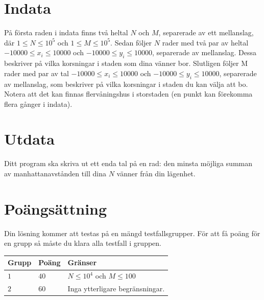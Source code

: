 \section*{Indata}
På första raden i indata finns två heltal $N$ och $M$, separerade av ett mellanslag, där $1 \leq N \leq 10^5$ och $1 \leq M \leq 10^5$. Sedan följer $N$ rader med två par av heltal $-10 000 \leq x_i \leq 10 000$ och $-10 000 \leq y_i \leq 10 000$, separerade av mellanslag. Dessa beskriver på vilka korsningar i staden som dina vänner bor. Slutligen följer M rader med par av tal $-10 000 \leq x_i \leq 10 000$ och $-10 000 \leq y_i \leq 10 000$, separerade av mellanslag, som beskriver på vilka korsningar i staden du kan välja att bo. Notera att det kan finnas flervåningshus i storstaden (en punkt kan förekomma flera gånger i indata).

\section*{Utdata}
Ditt program ska skriva ut ett enda tal på en rad: den minsta möjliga summan av manhattanavstånden till dina $N$ vänner från din lägenhet.

\section*{Poängsättning}
Din lösning kommer att testas på en mängd testfallsgrupper.
För att få poäng för en grupp så måste du klara alla testfall i gruppen.

\noindent
\begin{tabular}{| l | l | p{12cm} |}
  \hline
  \textbf{Grupp} & \textbf{Poäng} & \textbf{Gränser} \\ \hline
  $1$   & $40$       & $N \leq 10^4$ och $M \leq 100$ \\ \hline
  $2$   & $60$       & Inga ytterligare begränsningar.\\ \hline
\end{tabular}
